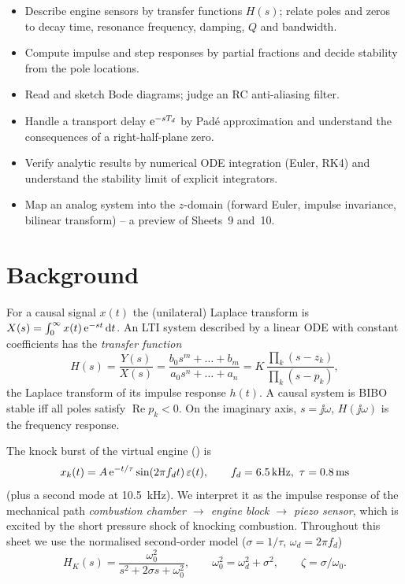 
\begin{goals}
\begin{itemize}
  \item Describe engine sensors by transfer functions $H(s)$; relate poles and
    zeros to decay time, resonance frequency, damping, $Q$ and bandwidth.
  \item Compute impulse and step responses by partial fractions and decide
    stability from the pole locations.
  \item Read and sketch Bode diagrams; judge an RC anti-aliasing filter.
  \item Handle a transport delay $\mathrm{e}^{-sT_d}$ by Pad\'e approximation and
    understand the consequences of a right-half-plane zero.
  \item Verify analytic results by numerical ODE integration (Euler, RK4) and
    understand the stability limit of explicit integrators.
  \item Map an analog system into the $z$-domain (forward Euler, impulse
    invariance, bilinear transform) -- a preview of Sheets~9 and~10.
\end{itemize}
\end{goals}

\section*{Background}

For a causal signal $x(t)$ the (unilateral) Laplace transform is
$X(s)=\int_0^\infty x(t)\,\mathrm{e}^{-st}\,\mathrm{d} t$. An LTI system described by a linear
ODE with constant coefficients has the \emph{transfer function}
\[
  H(s)=\frac{Y(s)}{X(s)}=\frac{b_0s^m+\dots+b_m}{a_0s^n+\dots+a_n}
      = K\,\frac{\prod_k (s-z_k)}{\prod_k (s-p_k)} ,
\]
the Laplace transform of its impulse response $h(t)$. A causal system is
BIBO stable iff all poles satisfy $\operatorname{Re}p_k<0$. On the imaginary
axis, $s=\jj\omega$, $H(\jj\omega)$ is the frequency response.

The knock burst of the virtual engine () is
\[
  x_k(t)=A\,\mathrm{e}^{-t/\tau}\sin(2\pi f_d t)\,\varepsilon(t),\qquad
  f_d=\SI{6.5}{kHz},\ \tau=\SI{0.8}{ms}
\]
(plus a second mode at \SI{10.5}{kHz}). We interpret it as the impulse response
of the mechanical path \emph{combustion chamber $\rightarrow$ engine block
$\rightarrow$ piezo sensor}, which is excited by the short pressure shock of
knocking combustion. Throughout this sheet we use the normalised second-order
model ($\sigma=1/\tau$, $\omega_d=2\pi f_d$)
\begin{equation}
  H_K(s)=\frac{\omega_0^2}{s^2+2\sigma s+\omega_0^2},\qquad
  \omega_0^2=\omega_d^2+\sigma^2,\qquad \zeta=\sigma/\omega_0 .
  \label{eq:s7res}
\end{equation}

